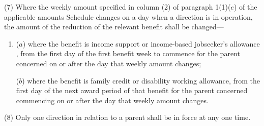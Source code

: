 \documentclass[a4paper]{article}
\begin{document}
(7) Where the weekly amount specified in column (2) of paragraph 1(1)($e$) of the applicable amounts Schedule changes on a day when a direction is in operation, the amount of the reduction of the relevant benefit shall be changed—
\begin{enumerate}\item[]
($a$) where the benefit is income support
or income-based jobseeker’s allowance%
, from the first day of the first benefit week to commence for the parent concerned on or after the day that weekly amount changes;

($b$) where the benefit is family credit or disability working allowance, from the first day of the next award period of that benefit for the parent concerned commencing on or after the day that weekly amount changes.
\end{enumerate}

(8) Only one direction in relation to a parent shall be in force at any one time.

\end{document}
